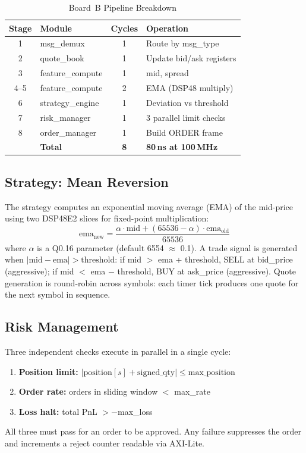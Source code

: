 \documentclass[conference]{IEEEtran}
\begin{document}
\begin{table}[h]
\centering
\caption{Board~B Pipeline Breakdown}
\label{tab:pipeline}
\begin{tabular}{@{}clcl@{}}
\toprule
\textbf{Stage} & \textbf{Module} & \textbf{Cycles} & \textbf{Operation} \\
\midrule
1 & msg\_demux & 1 & Route by msg\_type \\
2 & quote\_book & 1 & Update bid/ask registers \\
3 & feature\_compute & 1 & mid, spread \\
4--5 & feature\_compute & 2 & EMA (DSP48 multiply) \\
6 & strategy\_engine & 1 & Deviation vs threshold \\
7 & risk\_manager & 1 & 3 parallel limit checks \\
8 & order\_manager & 1 & Build ORDER frame \\
\midrule
& \textbf{Total} & \textbf{8} & \textbf{80\,ns at 100\,MHz} \\
\bottomrule
\end{tabular}
\end{table}

\subsection{Strategy: Mean Reversion}

The strategy computes an exponential moving average (EMA) of the mid-price using two DSP48E2 slices for fixed-point multiplication:
\begin{equation}
\text{ema}_{\text{new}} = \frac{\alpha \cdot \text{mid} + (65536 - \alpha) \cdot \text{ema}_{\text{old}}}{65536}
\end{equation}
where $\alpha$ is a Q0.16 parameter (default 6554 $\approx$ 0.1). A trade signal is generated when $|\text{mid} - \text{ema}| > \text{threshold}$: if mid $>$ ema + threshold, SELL at bid\_price (aggressive); if mid $<$ ema $-$ threshold, BUY at ask\_price (aggressive). Quote generation is round-robin across symbols: each timer tick produces one quote for the next symbol in sequence.

\subsection{Risk Management}

Three independent checks execute in parallel in a single cycle:
\begin{enumerate}[noitemsep]
  \item \textbf{Position limit:} $|\text{position}[s] + \text{signed\_qty}| \leq \text{max\_position}$
  \item \textbf{Order rate:} orders in sliding window $<$ max\_rate
  \item \textbf{Loss halt:} total PnL $> -$max\_loss
\end{enumerate}
All three must pass for an order to be approved. Any failure suppresses the order and increments a reject counter readable via AXI-Lite.
\end{document}
